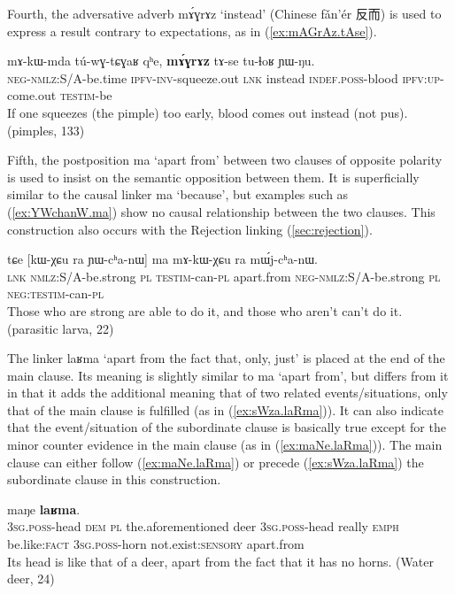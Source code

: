 \documentclass[oldfontcommands,oneside,a4paper,11pt]{article}
\newcommand{\ipa}[1]{{\phon \mbox{#1}}} %
\newcommand{\zh}[1]{{\cn #1}}
\newcommand{\refb}[1]{(\ref{#1})}
\begin{document}
Fourth, the adversative adverb \ipa{mɤ́ɣrɤz} `instead' (Chinese \ipa{fǎn'ér} \zh{反而}) is used to express a result contrary to expectations, as in  \refb{ex:mAGrAz.tAse}.  

\begin{exe}
\ex \label{ex:mAGrAz.tAse}
\gll
 \ipa{mɤ-kɯ-mda}    	\ipa{tú-wɣ-tɕɣaʁ}    	\ipa{qʰe,}    	\ipa{\textbf{mɤ́ɣrɤz}}    	\ipa{tɤ-se}    	\ipa{tu-ɬoʁ}    	\ipa{ɲɯ-ŋu.}    \\
 \textsc{neg-nmlz:S/A}-be.time \textsc{ipfv-inv}-squeeze.out \textsc{lnk} instead \textsc{indef.poss}-blood \textsc{ipfv:up}-come.out \textsc{testim}-be  \\
\glt If one squeezes (the pimple) too early, blood comes out instead (not pus). (pimples, 133)
 \end{exe}
 

Fifth, the  postposition \ipa{ma} `apart from' between two clauses of opposite polarity is used to insist on the semantic opposition between them.  It is superficially similar to the causal linker \ipa{ma} `because', but   examples such as \refb{ex:YWchanW.ma} show no causal relationship between the two clauses. This construction  also occurs with the Rejection linking \refb{sec:rejection}.
\begin{exe}
\ex \label{ex:YWchanW.ma}
\gll
\ipa{tɕe}  	[\ipa{kɯ-χɕu}  	\ipa{ra}  	\ipa{ɲɯ-cʰa-nɯ}] 	\ipa{ma}  	\ipa{mɤ-kɯ-χɕu}  	\ipa{ra}  	\ipa{mɯ́j-cʰa-nɯ.}  \\
\textsc{lnk} \textsc{nmlz}:S/A-be.strong \textsc{pl} \textsc{testim}-can-\textsc{pl} apart.from \textsc{neg-nmlz}:S/A-be.strong \textsc{pl} \textsc{neg:testim}-can-\textsc{pl} \\
\glt Those who are strong are able to do it, and those who aren't can't do it. (parasitic larva, 22)
\end{exe}

The   linker  \ipa{laʁma} `apart from the fact that, only, just' is placed at the end of the main clause. Its meaning is slightly similar to \ipa{ma} `apart from', but differs from it in that it adds the additional meaning that of two related events/situations, only that of the main clause is fulfilled (as in \refb{ex:sWza.laRma}). It can also indicate that the event/situation of the subordinate clause is basically true except for the minor counter evidence in the main clause  (as in \refb{ex:maNe.laRma}).   The main clause can either follow \refb{ex:maNe.laRma} or precede \refb{ex:sWza.laRma} the subordinate clause in this construction.
  \begin{exe}
\ex \label{ex:maNe.laRma}
\gll
[\ipa{ɯ-ku}  	\ipa{nɯ} \ipa{ra}   	\ipa{iɕqʰa}  	\ipa{qartsʰaz}  	\ipa{ɯ-ku}  	\ipa{wuma}  	\ipa{ʑo}  	\ipa{fse,}]  	\ipa{ɯ-ʁrɯ}  	\ipa{maŋe}  	\ipa{\textbf{laʁma}.}  	\\
\textsc{3sg.poss}-head \textsc{dem} \textsc{pl} the.aforementioned deer \textsc{3sg.poss}-head  really \textsc{emph} be.like:\textsc{fact} \textsc{3sg.poss}-horn not.exist:\textsc{sensory} apart.from \\
\glt Its head is like that of a deer, apart from the fact that it has no  horns. (Water deer, 24)
\end{exe} 
\end{document}
